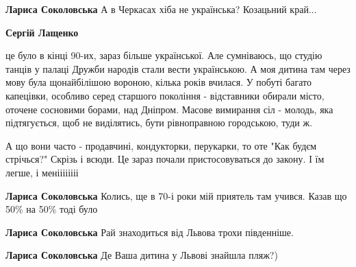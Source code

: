 \begin{itemize}
\begin{itemize}
\textbf{Лариса Соколовська} А в Черкасах хіба не українська? Козацьний край...

 
\textbf{Сергій Лащенко} 

це було в кінці 90-их, зараз більше української. Але сумніваюсь, що студію
танців у палаці Дружби народів стали вести українською. А моя дитина там через
мову була щонайбілішою вороною, кілька років вчилася. У побуті багато
капецівки, особливо серед старшого покоління - відставники обирали місто,
оточене сосновими борами, над Дніпром. Масове вимирання сіл - молодь, яка
підтягується, щоб не виділятись, бути рівноправною городською, туди ж. 

А що вони часто - продавчині, кондукторки, перукарки, то оте "Как будєм
стрічься?" Скрізь і всюди. Це зараз почали пристосовуваться до закону. І їм
легше, і меніііііііі

 
\textbf{Лариса Соколовська} Колись, ще в 70-і роки мій приятель там учився. Казав що 50\% на 50\% тоді було

 
\textbf{Лариса Соколовська} Рай знаходиться від Львова трохи південніше.

 
\textbf{Лариса Соколовська} Де Ваша дитина у Львові знайшла пляж?)

 

\end{itemize}
\end{itemize}
